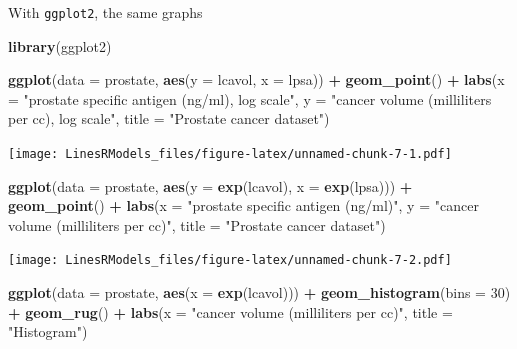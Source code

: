 \documentclass[]{book}
\newenvironment{Shaded}{\begin{snugshade}}{\end{snugshade}}
\newcommand{\KeywordTok}[1]{\textcolor[rgb]{0.13,0.29,0.53}{\textbf{#1}}}
\newcommand{\DataTypeTok}[1]{\textcolor[rgb]{0.13,0.29,0.53}{#1}}
\newcommand{\DecValTok}[1]{\textcolor[rgb]{0.00,0.00,0.81}{#1}}
\newcommand{\StringTok}[1]{\textcolor[rgb]{0.31,0.60,0.02}{#1}}
\newcommand{\OperatorTok}[1]{\textcolor[rgb]{0.81,0.36,0.00}{\textbf{#1}}}
\newcommand{\NormalTok}[1]{#1}
\theoremstyle{definition}
\theoremstyle{definition}
\theoremstyle{definition}
\theoremstyle{remark}
\begin{document}
With \texttt{ggplot2}, the same graphs

\begin{Shaded}
\begin{Highlighting}[]
\KeywordTok{library}\NormalTok{(ggplot2)}

\KeywordTok{ggplot}\NormalTok{(}\DataTypeTok{data =}\NormalTok{ prostate, }\KeywordTok{aes}\NormalTok{(}\DataTypeTok{y =}\NormalTok{ lcavol, }\DataTypeTok{x =}\NormalTok{ lpsa)) }\OperatorTok{+}\StringTok{ }
\StringTok{  }\KeywordTok{geom_point}\NormalTok{() }\OperatorTok{+}
\StringTok{  }\KeywordTok{labs}\NormalTok{(}\DataTypeTok{x =} \StringTok{"prostate specific antigen (ng/ml), log scale"}\NormalTok{,}
       \DataTypeTok{y =} \StringTok{"cancer volume (milliliters per cc), log scale"}\NormalTok{,}
       \DataTypeTok{title =} \StringTok{"Prostate cancer dataset"}\NormalTok{)}
\end{Highlighting}
\end{Shaded}

\texttt{[image: LinesRModels\_files/figure-latex/unnamed-chunk-7-1.pdf]}

\begin{Shaded}
\begin{Highlighting}[]
\KeywordTok{ggplot}\NormalTok{(}\DataTypeTok{data =}\NormalTok{ prostate, }\KeywordTok{aes}\NormalTok{(}\DataTypeTok{y =} \KeywordTok{exp}\NormalTok{(lcavol), }\DataTypeTok{x =} \KeywordTok{exp}\NormalTok{(lpsa))) }\OperatorTok{+}\StringTok{ }
\StringTok{  }\KeywordTok{geom_point}\NormalTok{() }\OperatorTok{+}
\StringTok{  }\KeywordTok{labs}\NormalTok{(}\DataTypeTok{x =} \StringTok{"prostate specific antigen (ng/ml)"}\NormalTok{,}
       \DataTypeTok{y =} \StringTok{"cancer volume (milliliters per cc)"}\NormalTok{,}
       \DataTypeTok{title =} \StringTok{"Prostate cancer dataset"}\NormalTok{)}
\end{Highlighting}
\end{Shaded}

\texttt{[image: LinesRModels\_files/figure-latex/unnamed-chunk-7-2.pdf]}

\begin{Shaded}
\begin{Highlighting}[]
\KeywordTok{ggplot}\NormalTok{(}\DataTypeTok{data =}\NormalTok{ prostate, }\KeywordTok{aes}\NormalTok{(}\DataTypeTok{x =} \KeywordTok{exp}\NormalTok{(lcavol))) }\OperatorTok{+}\StringTok{ }
\StringTok{  }\KeywordTok{geom_histogram}\NormalTok{(}\DataTypeTok{bins =} \DecValTok{30}\NormalTok{) }\OperatorTok{+}\StringTok{ }\KeywordTok{geom_rug}\NormalTok{() }\OperatorTok{+}\StringTok{ }
\StringTok{  }\KeywordTok{labs}\NormalTok{(}\DataTypeTok{x =} \StringTok{"cancer volume (milliliters per cc)"}\NormalTok{,}
       \DataTypeTok{title =} \StringTok{"Histogram"}\NormalTok{)}
\end{Highlighting}
\end{Shaded}
\end{document}
